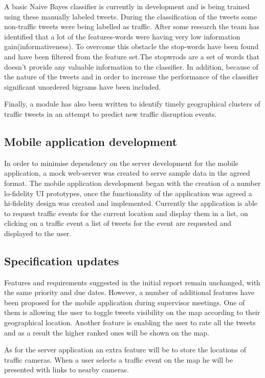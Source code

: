 A basic Naive Bayes classifier is currently in development and is being trained
using these manually labeled tweets. During the classification  of the tweets
some non-traffic tweets were being labelled as traffic. After some 
research the team has identified that a lot of the features-words were having
very low information gain(informativeness). To overcome this obstacle the
stop-words have been found and have been filtered from the feature set.The stopwrods 
are a set of words that doesn't provide any valuable information to the classifier.  In
addition, because of the nature of the tweets and in order to increase the
performance of the classifier significant unordered bigrams have been included. 

Finally, a module has also been written to identify timely geographical
clusters of traffic tweets in an attempt to predict new traffic disruption
events. 


\subsection{Mobile application development}

In order to minimise dependency on the server development for the mobile
application, a  mock web-server was created to serve sample data in the agreed
format. The mobile application development began with the creation of a number
lo-fidelity UI prototypes, once the functionality of the application was agreed
a hi-fidelity design was created and implemented. Currently the application is
able to request traffic events for the current location and display them in a
list, on clicking on a traffic event a list of tweets for the event are
requested and displayed to the user. 

\subsection{Specification updates}

Features and requirements suggested in the initial report remain unchanged,
with the same priority and due dates. However, a number of additional features
have been proposed for the mobile application during supervisor meetings. One
of them is allowing the user to toggle tweets visibility on the map according
to their geographical location. Another feature is enabling the user to rate
all the tweets and as a result the higher ranked ones will be shown on the map.

As for the server application an extra feature will be to store the locations
of traffic cameras. When a user selects a traffic event on the map he will be
presented with links to nearby cameras.


